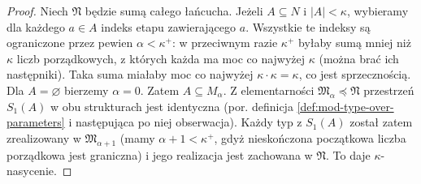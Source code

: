 \begin{proof}
Niech $\mathfrak N$ będzie sumą całego łańcucha.
Jeżeli $A\subseteq N$ i $|A|<\kappa$, wybieramy dla
każdego $a\in A$ indeks etapu zawierającego $a$.
Wszystkie te indeksy są ograniczone przez pewien
$\alpha<\kappa^+$: w przeciwnym razie $\kappa^+$ byłaby
sumą mniej niż $\kappa$ liczb porządkowych, z których
każda ma moc co najwyżej $\kappa$ (można brać ich następniki).
Taka suma miałaby moc co najwyżej $\kappa\cdot\kappa=\kappa$,
co jest sprzecznością. Dla $A=\varnothing$ bierzemy $\alpha=0$.
Zatem $A\subseteq M_\alpha$.
Z elementarności $\mathfrak M_\alpha\preccurlyeq\mathfrak N$
przestrzeń $S_1(A)$ w obu strukturach jest identyczna
(por. definicja \ref{def:mod-type-over-parameters}
i następująca po niej obserwacja).
Każdy typ z $S_1(A)$ został zatem zrealizowany w
$\mathfrak M_{\alpha+1}$ (mamy $\alpha+1<\kappa^+$,
gdyż nieskończona początkowa liczba porządkowa jest graniczna)
i jego realizacja jest zachowana
w $\mathfrak N$. To daje $\kappa$-nasycenie.
\end{proof}


